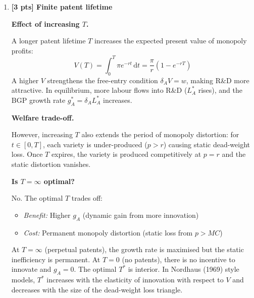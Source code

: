\documentclass[a4paper,11pt]{article}
\newcommand{\dd}{\mathrm{d}}
\begin{document}
\begin{enumerate}[label=\textbf{(\arabic*)},leftmargin=*]
\begin{answerbox}
Both distortions push in the same direction for R\&D: the market innovates \emph{too slowly}. Hence:
\[
  g_A^{\mathrm{mkt}} < g_A^{\mathrm{plnr}}
\]

\textbf{Policy mix.}
\begin{itemize}
  \item \emph{R\&D subsidy} (corrects appropriability): Subsidise research labour costs or patent revenues so that $\delta_A V^{\mathrm{eff}} = w$ at the social optimum. This raises $g_A$ toward the planner's rate.
  \item \emph{Output subsidy on intermediate goods} (corrects markup distortion): A per-unit subsidy $(1-\alpha)/\alpha \cdot r$ to intermediate producers brings $p$ down to $r$ and eliminates static dead-weight loss, raising $x$ to the first-best level.
  \item In practice: compulsory licensing, patent reform, or publicly funded basic research combine both objectives.
\end{itemize}
\end{answerbox}

\bigskip

\item \textbf{[3 pts] Finite patent lifetime}

\begin{answerbox}
\textbf{Effect of increasing $T$.}

A longer patent lifetime $T$ increases the expected present value of monopoly profits:
\[
  V(T) = \int_0^T \pi e^{-rt}\,\dd t = \frac{\pi}{r}\left(1 - e^{-rT}\right)
\]
A higher $V$ strengthens the free-entry condition $\delta_A V = w$, making R\&D more attractive. In equilibrium, more labour flows into R\&D ($L_A^*$ rises), and the BGP growth rate $g_A^* = \delta_A L_A^*$ increases.

\textbf{Welfare trade-off.}

However, increasing $T$ also extends the period of monopoly distortion: for $t \in [0,T]$, each variety is under-produced ($p > r$) causing static dead-weight loss. Once $T$ expires, the variety is produced competitively at $p = r$ and the static distortion vanishes.

\textbf{Is $T = \infty$ optimal?}

No. The optimal $T$ trades off:
\begin{itemize}
  \item \emph{Benefit:} Higher $g_A$ (dynamic gain from more innovation)
  \item \emph{Cost:} Permanent monopoly distortion (static loss from $p > MC$)
\end{itemize}
At $T = \infty$ (perpetual patents), the growth rate is maximised but the static inefficiency is permanent. At $T = 0$ (no patents), there is no incentive to innovate and $g_A = 0$. The optimal $T^*$ is interior. In Nordhaus (1969) style models, $T^*$ increases with the elasticity of innovation with respect to $V$ and decreases with the size of the dead-weight loss triangle.
\end{answerbox}

\end{enumerate}
\end{document}
